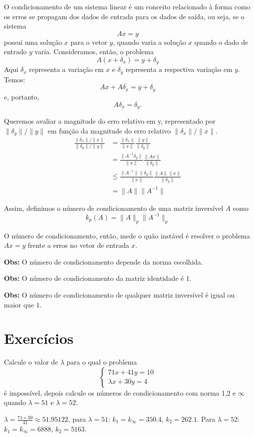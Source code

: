 O condicionamento de um sistema linear é um conceito relacionado à forma como os erros se propagam dos dados de entrada para os dados de saída, ou seja, se o sistema $$Ax=y$$
possui uma solução $x$ para o vetor $y$, quando varia a solução $x$ quando o dado de entrado $y$ varia. Consideramos, então, o problema
$$A(x+\delta_x)=y+\delta_y$$
Aqui $\delta_x$ representa a variação em $x$ e $\delta_y$ representa a respectiva variação em $y$. Temos:
$$Ax+A\delta_x=y+\delta_y$$ e, portanto,
$$A\delta_x=\delta_y.$$

Queremos avaliar a magnitude do erro relativo em y, representado por $\|\delta_y\|/\|y\|$ em função da magnitude do erro relativo $\|\delta_x\|/\|x\|$.
\begin{align*}
\frac{\|\delta_x\|/\|x\|}{\|\delta_y\|/\|y\|} &= \frac{\|\delta_x\|}{\|x\|}\frac{\|y\|}{\|\delta_y\|}\\ 
&= \frac{\|A^{-1}\delta_y\|}{\|x\|}\frac{\|Ax\|}{\|\delta_y\|} \\
&\leq \frac{\|A^{-1}\|\|\delta_y\|}{\|x\|}\frac{\|A\|\|x\|}{\|\delta_y\|}\\
&=\|A\|\|A^{-1}\|  
\end{align*}

Assim, definimos o número de condicionamento de uma matriz inversível $A$ como
$$k_p(A)=\|A\|_p \|A^{-1}\|_p$$

O número de condicionamento, então, mede o quão instável é resolver o problema $Ax=y$ frente a erros no vetor de entrada $x$.

{\bf Obs:} O número de condicionamento depende da norma escolhida.

{\bf Obs:} O número de condicionamento da matriz identidade é $1$.

{\bf Obs:} O número de condicionamento de qualquer matriz inversível é igual ou maior que $1$.

\section*{Exercícios}

\begin{Exercise} Calcule o valor de $\lambda$ para o qual o problema
$$\left\{ \begin{array}{l}71x+41y=10\\
\lambda x+30y=4
\end{array}
\right.$$
é impossível, depois calcule os números de condicionamento com norma 1,2 e $\infty$ quando $\lambda=51$ e $\lambda=52$.
\end{Exercise}
\begin{Answer}
  \begin{tiny}
$\lambda=\frac{71\times 30}{41}\approx  51.95122$, para $\lambda=51$: $k_1=k_\infty=350.4$, $k_2=262.1$. Para $\lambda=52$: $k_1=k_\infty= 6888$, $k_2=5163$.    
  \end{tiny}
\end{Answer}

